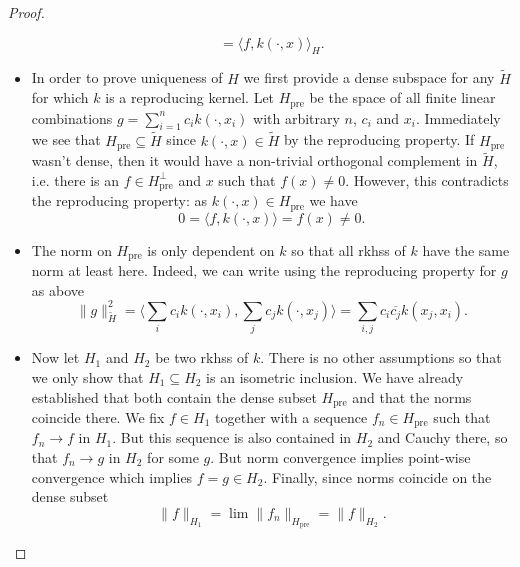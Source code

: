 \begin{proof}
\begin{itemize}
\begin{equation*}
                    = \langle f, k(\cdot,x) \rangle_H.
            \end{equation*}
        \item In order to prove uniqueness of $H$ we first provide 
            a dense subspace for any $\tilde H$ for which $k$ is 
            a reproducing kernel.
            Let $H_{\textrm{pre}}$ be the space of all finite linear 
            combinations $g = \sum_{i=1}^n c_i k(\cdot,x_i)$ with 
            arbitrary $n$, $c_i$ and $x_i$.
            Immediately we see that 
            $H_{\textrm{pre}} \subseteq \tilde H$
            since $k(\cdot,x) \in \tilde H$ by the reproducing property.
            If $H_{\textrm{pre}}$ wasn't dense, then it would have 
            a non-trivial orthogonal complement in $\tilde H$, i.e.
            there is an $f \in H_{\textrm{pre}}^\perp$ and $x$ such that
            $f(x) \neq 0$.
            However, this contradicts the reproducing property: 
            as $k(\cdot,x) \in H_{\textrm{pre}}$ we have 
            \begin{equation*}
                0 = \langle f, k(\cdot,x) \rangle = f(x) \neq 0.
            \end{equation*}
        \item The norm on $H_{\textrm{pre}}$ is only dependent on
            $k$ so that all rkhss of $k$ have the same norm at least 
            here.
            Indeed, we can write using the reproducing property
            for $g$ as above
            \begin{equation}\label{eq:rkhsnorm}
                \| g \|_{\tilde H}^2
                = \langle \sum_i c_i k(\cdot,x_i),
                    \sum_j c_j k(\cdot,x_j) \rangle
                = \sum_{i,j} c_i \overline{c_j} k(x_j,x_i).
            \end{equation}
        \item Now let $H_1$ and $H_2$ be two rkhss of $k$.
            There is no other assumptions so that we only show that 
            $H_1 \subseteq H_2$ is an isometric inclusion.
            We have already established that both contain the dense 
            subset $H_{\textrm{pre}}$ and that the norms coincide 
            there.
            We fix $f \in H_1$ together with a sequence
            $f_n \in H_{\textrm{pre}}$ such that $f_n \to f$ in
            $H_1$.
            But this sequence is also contained in $H_2$ and 
            Cauchy there, so that $f_n \to g$ in $H_2$ for some $g$.
            But norm convergence implies point-wise convergence
            which implies $f = g \in H_2$.
            Finally, since norms coincide on the dense subset 
            \begin{equation*}
                \|f\|_{H_1} = \lim \| f_n \|_{H_{\textrm{pre}}}
                    = \| f \|_{H_2}.
            \end{equation*}
    \end{itemize}
\end{proof}

